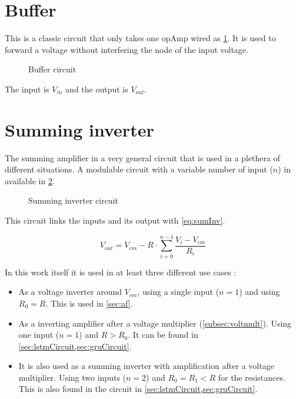 \label{ap:circuit}

\section{Buffer}\label{apsec:buffer}

This is a classic circuit that only takes one \ac{opAmp} wired as \cref{circt:buffer}. It is used to forward a voltage without interfering the node of the input voltage.

\begin{figure}[H]
  \centering
  
  \caption{Buffer circuit}
  \label{circt:buffer}
\end{figure}

The input is $V_{in}$ and the output is $V_{out}$.

\section{Summing inverter}\label{apsec:sumInv}

The summing amplifier in a very general circuit that is used in a plethera of different situations. A modulable circuit with a variable number of input ($n$) in available in \cref{circt:sumInv}.

\begin{figure}[H]
  \centering
  
  \caption{Summing inverter circuit}
  \label{circt:sumInv}
\end{figure}

This circuit links the inputs and its output with \cref{eq:sumInv}.

\begin{equation}\label{eq:sumInv}
  V_{out}=V_{cm}-R\cdot\sum_{i=0}^{n-1}\frac{V_i-V_{cm}}{R_i}
\end{equation}

In this work itself it is used in at least three different use cases :

\begin{itemize}
  \item As a voltage inverter around $V_{cm}$, using a single input ($n=1$) and using $R_0=R$. This is used in \cref{sec:af}.
  \item As a inverting amplifier after a voltage multiplier (\cref{subsec:voltmult}). Using one input ($n=1$) and $R>R_0$. It can be found in \cref{sec:lstmCircuit,sec:gruCircuit}.
  \item It is also used as a summing inverter with amplification after a voltage multiplier. Using two inputs ($n=2$) and $R_0=R_1<R$ for the resistances. This is also found in the circuit in \cref{sec:lstmCircuit,sec:gruCircuit}.
\end{itemize}

